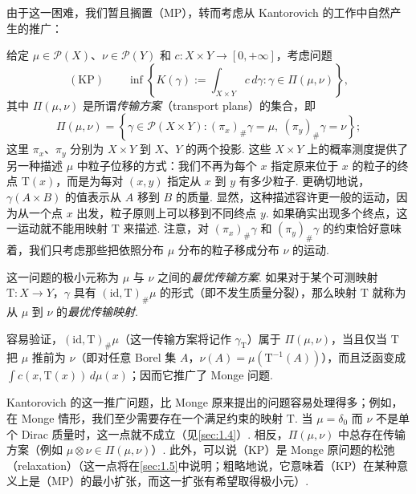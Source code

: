 由于这一困难，我们暂且搁置（MP），转而考虑从 Kantorovich 的工作\cite{b200}中自然产生的推广：

\begin{problem}\label{obj:1.2}
给定 $\mu\in\mathscr P(X)$、$\nu\in\mathscr P(Y)$ 和 $c:X\times Y\to[0,+\infty]$，考虑问题
\begin{equation}\label{eq:1.2}
(\mathrm{KP})\qquad
\inf\left\{K(\gamma):=\int_{X\times Y}c\,d\gamma:\gamma\in\Pi(\mu,\nu)\right\},
\end{equation}
其中 $\Pi(\mu,\nu)$ 是所谓\emph{传输方案}（transport plans）的集合，即
\[
\Pi(\mu,\nu)=\left\{\gamma\in\mathscr P(X\times Y):(\pi_x)_\#\gamma=\mu,\ (\pi_y)_\#\gamma=\nu\right\};
\]
这里 $\pi_x$、$\pi_y$ 分别为 $X\times Y$ 到 $X$、$Y$ 的两个投影. 这些 $X\times Y$ 上的概率测度提供了另一种描述 $\mu$ 中粒子位移的方式：我们不再为每个 $x$ 指定原来位于 $x$ 的粒子的终点 $\mathrm{T}(x)$，而是为每对 $(x,y)$ 指定从 $x$ 到 $y$ 有多少粒子. 更确切地说，$\gamma(A\times B)$ 的值表示从 $A$ 移到 $B$ 的质量. 显然，这种描述容许更一般的运动，因为从一个点 $x$ 出发，粒子原则上可以移到不同终点 $y$. 如果确实出现多个终点，这一运动就不能用映射 $\mathrm{T}$ 来描述. 注意，对 $(\pi_x)_\#\gamma$ 和 $(\pi_y)_\#\gamma$ 的约束恰好意味着，我们只考虑那些把依照分布 $\mu$ 分布的粒子移成分布 $\nu$ 的运动.

这一问题的极小元称为 $\mu$ 与 $\nu$ 之间的\emph{最优传输方案}. 如果对于某个可测映射 $\mathrm{T}:X\to Y$，$\gamma$ 具有 $(\mathrm{id},\mathrm{T})_\#\mu$ 的形式（即不发生质量分裂），那么映射 $\mathrm{T}$ 就称为从 $\mu$ 到 $\nu$ 的\emph{最优传输映射}.
\end{problem}

\begin{remark}\label{obj:1.3}
容易验证，$(\mathrm{id},\mathrm{T})_\#\mu$（这一传输方案将记作 $\gamma_\mathrm{T}$）属于 $\Pi(\mu,\nu)$，当且仅当 $\mathrm{T}$ 把 $\mu$ 推前为 $\nu$（即对任意 Borel 集 $A$，$\nu(A)=\mu(\mathrm{T}^{-1}(A))$），而且泛函变成 $\int c(x,\mathrm{T}(x))\,d\mu(x)$；因而它推广了 Monge 问题.
\end{remark}

Kantorovich 的这一推广问题，比 Monge 原来提出的问题容易处理得多；例如，在 Monge 情形，我们至少需要存在一个满足约束的映射 $\mathrm{T}$. 当 $\mu=\delta_0$ 而 $\nu$ 不是单个 Dirac 质量时，这一点就不成立（见\autoref{sec:1.4}）. 相反，$\Pi(\mu,\nu)$ 中总存在传输方案（例如 $\mu\otimes\nu\in\Pi(\mu,\nu)$）. 此外，可以说（KP）是 Monge 原问题的松弛（relaxation）（这一点将在\autoref{sec:1.5}中说明；粗略地说，它意味着（KP）在某种意义上是（MP）的最小扩张，而这一扩张有希望取得极小元）.

